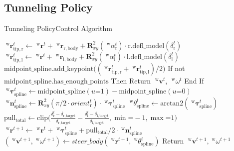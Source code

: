 \documentclass[AIRbeamer
,optEnglish
,optBiber
,optBibstyleAlphabetic
,optBeamerClassicFormat%
]{AIRlatex}
\begin{document}
    \subsection{Tunneling Policy}
    \begin{frame}{Tunneling Policy}{Control Algorithm}
        \begin{algorithm}[H]
            \caption{Tunneling Policy Control}
            \begin{algorithmic}[1]
                \State \(\;^{\mathrm{w}}\boldsymbol{r}_{\mathrm{tip, r}}^{t} \gets \;^{\mathrm{w}}\boldsymbol{r}^{t} + \;^{\mathrm{w}}\boldsymbol{r}_{\mathrm{r, body}} + \boldsymbol{R}_{xy}^{2}(\; ^{\mathrm{w}}\alpha_{\mathrm{r}}^{t}) \cdot \mathrm{r.defl\_model}(\delta_{\mathrm{r}}^{t})\)
                \State \(\;^{\mathrm{w}}\boldsymbol{r}_{\mathrm{tip, l}}^{t} \gets \;^{\mathrm{w}}\boldsymbol{r}^{t} + \;^{\mathrm{w}}\boldsymbol{r}_{\mathrm{l, body}} + \boldsymbol{R}_{xy}^{2}(\; ^{\mathrm{w}}\alpha_{\mathrm{l}}^{t}) \cdot \mathrm{l.defl\_model}(\delta_{\mathrm{l}}^{t})\)
                \State \colorbox{yellow!40}{\(\mathrm{midpoint\_spline.add\_keypoint}\big((\;^{\mathrm{w}}\boldsymbol{r}_{\mathrm{tip, r}}^{t} + \;^{\mathrm{w}}\boldsymbol{r}_{\mathrm{tip, l}}^{t}) / 2\big)\)}
                \State If not \(\mathrm{midpoint\_spline.has\_enough\_points}\) Then Return \(\;^{\mathrm{w}}\boldsymbol{v}^{t}\), \(\;^{\mathrm{w}}\omega^{t}\) End If
                \State
                \State \(\;^{\mathrm{w}}\boldsymbol{\tau}_{\mathrm{spline}}^{t} \gets \mathrm{midpoint\_spline}(u\mathord{=}1) - \mathrm{midpoint\_spline}(u\mathord{=}0)\)
                \State \(\;^{\mathrm{w}}\boldsymbol{n}_{\mathrm{spline}}^{t} \gets \boldsymbol{R}_{xy}^{2}(\pi/2 \cdot orient_\mathrm{r}^t)\cdot\;^{\mathrm{w}}\boldsymbol{\tau}_{\mathrm{spline}}^{t}\)
                \State \colorbox{cyan!40}{\(\;^{\mathrm{w}}\theta_{\mathrm{spline}}^{t} \gets \mathrm{arctan2}(\;^{\mathrm{w}}\boldsymbol{\tau}_{\mathrm{spline}}^{t})\)}
                \State \(\mathrm{pull_{total}} \gets \mathrm{clip}\big(\frac{\delta_{\mathrm{r}}^{t} - \delta_{\mathrm{r, target}}}{\delta_{\mathrm{r, target}}} - \frac{\delta_{\mathrm{l}}^{t} - \delta_{\mathrm{l, target}}}{\delta_{\mathrm{l, target}}},\mathrm{\min}\mathord{=}-1, \mathrm{\max}\mathord{=}1\big)\)
                \State \colorbox{green!40}{\(\;^{\mathrm{w}}\boldsymbol{r}^{t+1} \gets \;^{\mathrm{w}}\boldsymbol{r}^{t} + \;^{\mathrm{w}}\boldsymbol{\tau}_{\mathrm{spline}}^{t} + \mathrm{pull_{total}}/2 \cdot \;^{\mathrm{w}}\boldsymbol{n}_{\mathrm{spline}}^{t}\)}
                \State \((\;^{\mathrm{w}}\boldsymbol{v}^{t+1}, \;^{\mathrm{w}}\omega^{t+1}) \gets steer\_body(\;^{\mathrm{w}}\boldsymbol{r}^{t+1},\;^{\mathrm{w}}\theta_{\mathrm{spline}}^{t})\)
                \State Return \(\;^{\mathrm{w}}\boldsymbol{v}^{t+1}, \;^{\mathrm{w}}\omega^{t+1}\)
            \end{algorithmic}
        \end{algorithm}
    \end{frame}
\end{document}
